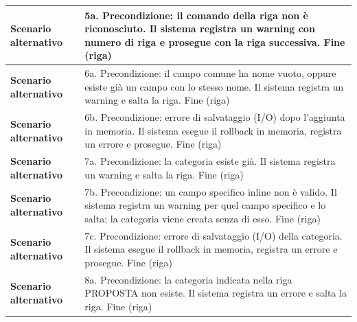 \documentclass[12pt, a4paper, oneside]{report}
\begin{document}
\begin{tabularx}{\textwidth}{|l|X|}
    \textbf{Scenario alternativo} & 
    5a. Precondizione: il comando della riga non è riconosciuto.\newline
    Il sistema registra un warning con numero di riga e prosegue con la riga successiva.\newline
    Fine (riga) \\ \hline

    \textbf{Scenario alternativo} & 
    6a. Precondizione: il campo comune ha nome vuoto, oppure esiste già un campo con lo stesso nome.\newline
    Il sistema registra un warning e salta la riga.\newline
    Fine (riga) \\ \hline

    \textbf{Scenario alternativo} & 
    6b. Precondizione: errore di salvataggio (I/O) dopo l'aggiunta in memoria.\newline
    Il sistema esegue il rollback in memoria, registra un errore e prosegue.\newline
    Fine (riga) \\ \hline

    \textbf{Scenario alternativo} & 
    7a. Precondizione: la categoria esiste già.\newline
    Il sistema registra un warning e salta la riga.\newline
    Fine (riga) \\ \hline

    \textbf{Scenario alternativo} & 
    7b. Precondizione: un campo specifico inline non è valido.\newline
    Il sistema registra un warning per quel campo specifico e lo salta; la categoria viene creata senza di esso.\newline
    Fine (riga) \\ \hline

    \textbf{Scenario alternativo} & 
    7c. Precondizione: errore di salvataggio (I/O) della categoria.\newline
    Il sistema esegue il rollback in memoria, registra un errore e prosegue.\newline
    Fine (riga) \\ \hline

    \textbf{Scenario alternativo} & 
    8a. Precondizione: la categoria indicata nella riga PROPOSTA non esiste.\newline
    Il sistema registra un errore e salta la riga.\newline
    Fine (riga) \\ \hline


\end{tabularx}
\end{document}
